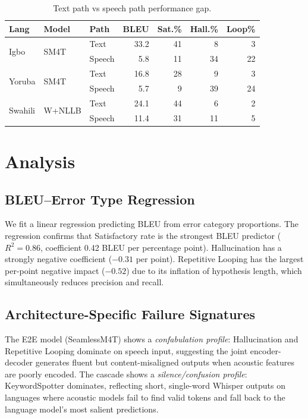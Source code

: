 \documentclass[11pt,a4paper]{article}
\begin{document}
\begin{table}[t]
\centering
\small
\caption{Text path vs speech path performance gap.}
\label{tab:path_gap}
\begin{tabular}{lllrrrr}
\toprule
\textbf{Lang} & \textbf{Model} & \textbf{Path} & \textbf{BLEU} & \textbf{Sat.\%} & \textbf{Hall.\%} & \textbf{Loop\%} \\
\midrule
\multirow{2}{*}{Igbo} & \multirow{2}{*}{SM4T}
  & Text  & 33.2 & 41 &  8 &  3 \\
  & & Speech &  5.8 & 11 & 34 & 22 \\
\midrule
\multirow{2}{*}{Yoruba} & \multirow{2}{*}{SM4T}
  & Text  & 16.8 & 28 &  9 &  3 \\
  & & Speech &  5.7 &  9 & 39 & 24 \\
\midrule
\multirow{2}{*}{Swahili} & \multirow{2}{*}{W+NLLB}
  & Text  & 24.1 & 44 &  6 &  2 \\
  & & Speech & 11.4 & 31 & 11 &  5 \\
\bottomrule
\end{tabular}
\end{table}

\section{Analysis}
\label{sec:analysis}

\subsection{BLEU–Error Type Regression}
We fit a linear regression predicting BLEU from error category proportions. The regression confirms that Satisfactory rate is the strongest BLEU predictor ($R^2 = 0.86$, coefficient 0.42 BLEU per percentage point). Hallucination has a strongly negative coefficient ($-0.31$ per point). Repetitive Looping has the largest per-point negative impact ($-0.52$) due to its inflation of hypothesis length, which simultaneously reduces precision and recall.

\subsection{Architecture-Specific Failure Signatures}
The E2E model (SeamlessM4T) shows a \emph{confabulation profile}: Hallucination and Repetitive Looping dominate on speech input, suggesting the joint encoder-decoder generates fluent but content-misaligned outputs when acoustic features are poorly encoded. The cascade shows a \emph{silence/confusion profile}: KeywordSpotter dominates, reflecting short, single-word Whisper outputs on languages where acoustic models fail to find valid tokens and fall back to the language model's most salient predictions.
\end{document}
